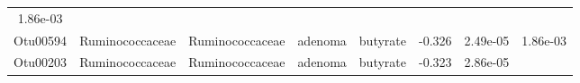 \documentclass[11pt,]{article}
\begin{document}
\begin{longtable}[]{@{}cccccccc@{}}
\begin{minipage}[t]{0.08\columnwidth}
1.86e-03\strut
\end{minipage}\tabularnewline
\begin{minipage}[t]{0.08\columnwidth}\centering\strut
Otu00594\strut
\end{minipage} & \begin{minipage}[t]{0.15\columnwidth}\centering\strut
Ruminococcaceae\strut
\end{minipage} & \begin{minipage}[t]{0.15\columnwidth}\centering\strut
Ruminococcaceae\strut
\end{minipage} & \begin{minipage}[t]{0.08\columnwidth}\centering\strut
adenoma\strut
\end{minipage} & \begin{minipage}[t]{0.09\columnwidth}\centering\strut
butyrate\strut
\end{minipage} & \begin{minipage}[t]{0.07\columnwidth}\centering\strut
-0.326\strut
\end{minipage} & \begin{minipage}[t]{0.08\columnwidth}\centering\strut
2.49e-05\strut
\end{minipage} & \begin{minipage}[t]{0.08\columnwidth}\centering\strut
1.86e-03\strut
\end{minipage}\tabularnewline
\begin{minipage}[t]{0.08\columnwidth}\centering\strut
Otu00203\strut
\end{minipage} & \begin{minipage}[t]{0.15\columnwidth}\centering\strut
Ruminococcaceae\strut
\end{minipage} & \begin{minipage}[t]{0.15\columnwidth}\centering\strut
Ruminococcaceae\strut
\end{minipage} & \begin{minipage}[t]{0.08\columnwidth}\centering\strut
adenoma\strut
\end{minipage} & \begin{minipage}[t]{0.09\columnwidth}\centering\strut
butyrate\strut
\end{minipage} & \begin{minipage}[t]{0.07\columnwidth}\centering\strut
-0.323\strut
\end{minipage} & \begin{minipage}[t]{0.08\columnwidth}\centering\strut
2.86e-05\strut
\end{minipage} & \begin{minipage}[t]{0.08\columnwidth}\centering\strut

\end{minipage}
\end{longtable}
\end{document}
